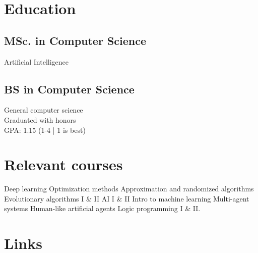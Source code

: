\documentclass[a4paper]{deedy-resume} %
\begin{document}
\begin{minipage}[t]{0.33\textwidth} %


\section{Education} 

\subsection{MSc. in Computer Science}
Artificial Intelligence \\


\sectionspace %

\subsection{BS in Computer Science}
General computer science \\
Graduated with honors \\
GPA: 1.15 (1-4 | 1 is best) \\

\sectionspace %

\section{Relevant courses}

Deep learning \textbullet{} Optimization methods \textbullet{} Approximation and randomized algorithms \textbullet{} Evolutionary algorithms I \& II \textbullet{} AI I \& II \textbullet{} Intro to machine learning \textbullet{} Multi-agent systems \textbullet{} Human-like artificial agents \textbullet{} Logic programming I \& II.

\sectionspace %


\section{Links} 


\end{minipage}
\end{document}

